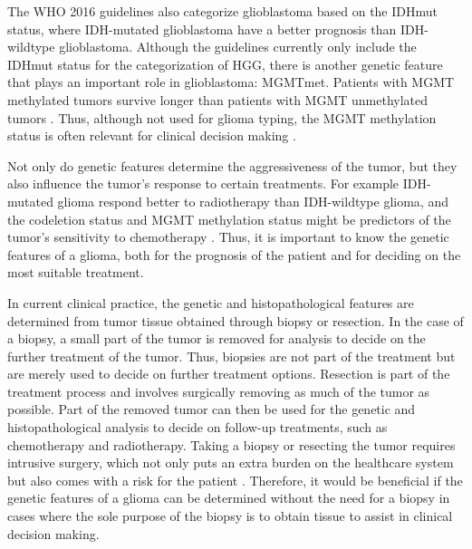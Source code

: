 The \gls{WHO} 2016 guidelines also categorize \gls{glioblastoma} based on the \gls{IDHmut} status, where \gls{IDH}-mutated \gls{glioblastoma} have a better prognosis than \gls{IDH}-wildtype \gls{glioblastoma}.
Although the guidelines currently only include the \gls{IDHmut} status for the categorization of \gls{HGG}, there is another genetic feature that plays an important role in \gls{glioblastoma}: \gls{MGMTmet}.
Patients with \gls{MGMT} methylated \glspl{tumor} survive longer than patients with \gls{MGMT} unmethylated \glspl{tumor} \autocite{martinez2007MGMT, gessler2018MGMT, weller2009molecularGBM}.
Thus, although not used for \gls{glioma} typing, the \gls{MGMT} methylation status is often relevant for clinical decision making \autocite{molinaro2019geneticepidemiology}.

Not only do genetic features determine the aggressiveness of the \gls{tumor}, but they also influence the \gls{tumor}'s response to certain treatments.
For example \gls{IDH}-mutated \gls{glioma} respond better to radiotherapy than \gls{IDH}-wildtype \gls{glioma}, and the \gls{codeletion} status and \gls{MGMT} methylation status might be predictors of the \gls{tumor}'s sensitivity to chemotherapy \autocite{juratli2015IDHtreatment, idbaih2007markersresponse}.
Thus, it is important to know the genetic features of a \gls{glioma}, both for the prognosis of the patient and for deciding on the most suitable treatment.

In current clinical practice, the genetic and histopathological features are determined from \gls{tumor} tissue obtained through biopsy or resection.
In the case of a biopsy, a small part of the \gls{tumor} is removed for analysis to decide on the further treatment of the \gls{tumor}.
Thus, biopsies are not part of the treatment but are merely used to decide on further treatment options.
Resection is part of the treatment process and involves surgically removing as much of the \gls{tumor} as possible.
Part of the removed \gls{tumor} can then be used for the genetic and histopathological analysis to decide on follow-up treatments, such as chemotherapy and radiotherapy.
Taking a biopsy or resecting the \gls{tumor} requires intrusive surgery, which not only puts an extra burden on the healthcare system but also comes with a risk for the patient \autocite{chen2009biopsy}.
Therefore, it would be beneficial if the genetic features of a \gls{glioma} can be determined without the need for a biopsy in cases where the sole purpose of the biopsy is to obtain tissue to assist in clinical decision making.

